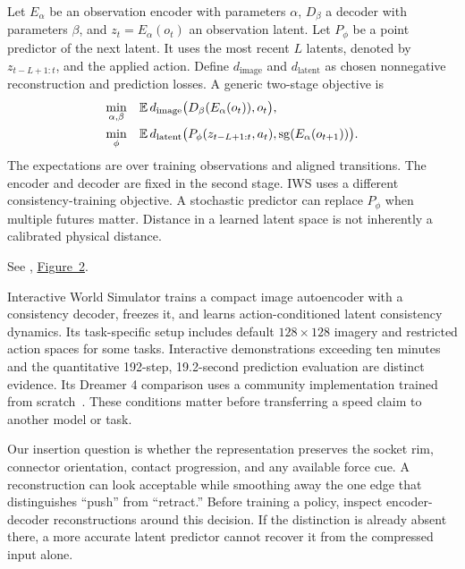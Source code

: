 Let $E_\alpha$ be an observation encoder with parameters $\alpha$, $D_\beta$ a decoder with parameters $\beta$, and $z_t=E_\alpha(o_t)$ an observation latent. Let $P_\phi$ be a point predictor of the next latent. It uses the most recent $L$ latents, denoted by $z_{t-L+1:t}$, and the applied action. Define $d_{\mathrm{image}}$ and $d_{\mathrm{latent}}$ as chosen nonnegative reconstruction and prediction losses. A generic two-stage objective is
\begin{align}
 \min_{\alpha,\beta}\quad &\mathbb{E}\,d_{\mathrm{image}}\big(D_\beta(E_\alpha(o_t)),o_t\big),\label{eq:middle-ae}\\
 \min_{\phi}\quad &\mathbb{E}\,d_{\mathrm{latent}}\big(P_\phi(z_{t-L+1:t},a_t),
                    \operatorname{sg}(E_\alpha(o_{t+1}))\big).
 \label{eq:middle-latent}
\end{align}
The expectations are over training observations and aligned transitions. The encoder and decoder are fixed in the second stage. IWS uses a different consistency-training objective. A stochastic predictor can replace $P_\phi$ when multiple futures matter. Distance in a learned latent space is not inherently a calibrated physical distance.

\noindent See \citet{iws}, \href{https://arxiv.org/pdf/2603.08546v1}{Figure~2}.


Interactive World Simulator trains a compact image autoencoder with a consistency decoder, freezes it, and learns action-conditioned latent consistency dynamics. Its task-specific setup includes default $128\times128$ imagery and restricted action spaces for some tasks. Interactive demonstrations exceeding ten minutes and the quantitative 192-step, 19.2-second prediction evaluation are distinct evidence. Its Dreamer 4 comparison uses a community implementation trained from scratch~\citep[Secs.~III-B and IV-A--B]{iws}. These conditions matter before transferring a speed claim to another model or task.

Our insertion question is whether the representation preserves the socket rim, connector orientation, contact progression, and any available force cue. A reconstruction can look acceptable while smoothing away the one edge that distinguishes ``push'' from ``retract.'' Before training a policy, inspect encoder-decoder reconstructions around this decision. If the distinction is already absent there, a more accurate latent predictor cannot recover it from the compressed input alone.

